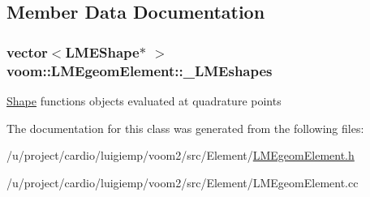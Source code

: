 \subsection{Member Data Documentation}
\hypertarget{classvoom_1_1_l_m_egeom_element_a76909b4c2030b797f17106f5bc5e3b11}{
\subsubsection[{\_\-LMEshapes}]{\setlength{\rightskip}{0pt plus 5cm}vector$<${\bf LMEShape}$\ast$ $>$ {\bf voom::LMEgeomElement::\_\-LMEshapes}}}
\label{classvoom_1_1_l_m_egeom_element_a76909b4c2030b797f17106f5bc5e3b11}
\hyperlink{classvoom_1_1_shape}{Shape} functions objects evaluated at quadrature points 

The documentation for this class was generated from the following files:\begin{DoxyCompactItemize}
\item 
/u/project/cardio/luigiemp/voom2/src/Element/\hyperlink{_l_m_egeom_element_8h}{LMEgeomElement.h}\item 
/u/project/cardio/luigiemp/voom2/src/Element/LMEgeomElement.cc\end{DoxyCompactItemize}
